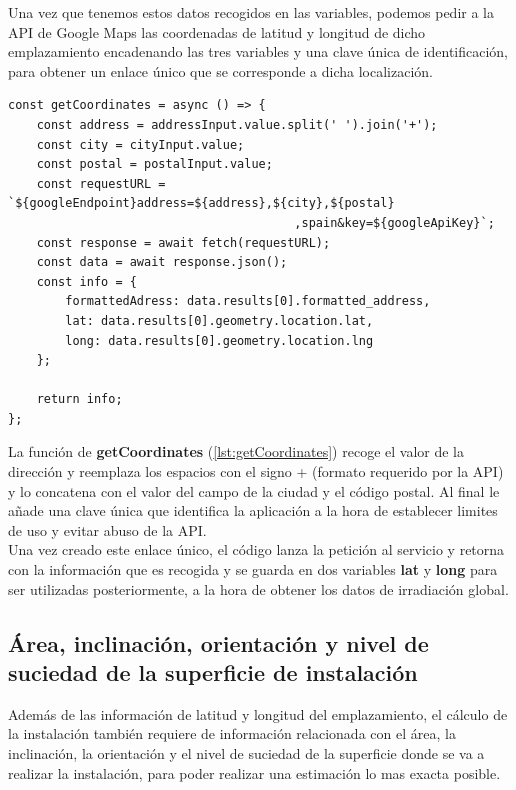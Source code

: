 \documentclass[11pt]{report}
\begin{document}
Una vez que tenemos estos datos recogidos en las variables, podemos pedir a la API de Google Maps las coordenadas de latitud y longitud de dicho emplazamiento encadenando las tres variables y una clave única de identificación,  para obtener un enlace único que se corresponde a dicha localización.\\

\begin{lstlisting}[style=ES6, label={lst:getCoordinates}, caption={Función encargada de solicitar los datos a la API}]
const getCoordinates = async () => {
	const address = addressInput.value.split(' ').join('+');
	const city = cityInput.value;
	const postal = postalInput.value;
	const requestURL = `${googleEndpoint}address=${address},${city},${postal}
										,spain&key=${googleApiKey}`;
	const response = await fetch(requestURL);
	const data = await response.json();
	const info = {
		formattedAdress: data.results[0].formatted_address,
		lat: data.results[0].geometry.location.lat,
		long: data.results[0].geometry.location.lng
	};

	return info;
};
\end{lstlisting}

La función de \textbf{getCoordinates} (\ref{lst:getCoordinates}) recoge el valor de la dirección y reemplaza los espacios con el signo + (formato requerido por la API) y lo concatena con el valor del campo de la ciudad y el código postal. Al final le añade una clave única que identifica la aplicación a la hora de establecer limites de uso y evitar abuso de la API.\\

Una vez creado este enlace único, el código lanza la petición al servicio y retorna con la información que es recogida y se guarda en dos variables \textbf{lat} y \textbf{long} para ser utilizadas posteriormente, a la hora de obtener los datos de irradiación global.

\subsection{Área, inclinación, orientación y nivel de suciedad de la superficie de instalación}

Además de las información de latitud y longitud del emplazamiento, el cálculo de la instalación también requiere de información relacionada con el área, la inclinación, la orientación y el nivel de suciedad de la superficie donde se va a realizar la instalación, para poder realizar una estimación lo mas exacta posible.
\end{document}
